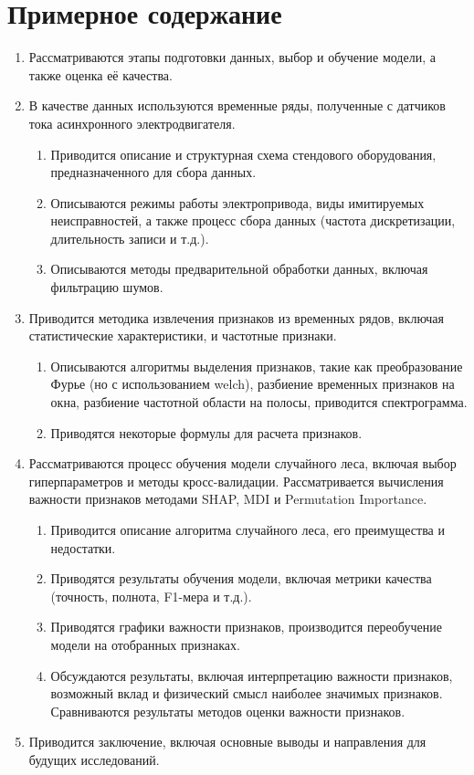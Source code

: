 \chapter*{Примерное содержание}

\begin{enumerate}
    \item Рассматриваются этапы подготовки данных, выбор и обучение модели, а также оценка её качества.
    \item В качестве данных используются временные ряды, полученные с датчиков тока асинхронного электродвигателя.
    \begin{enumerate}
        \item Приводится описание и структурная схема стендового оборудования, предназначенного для сбора данных.
        \item Описываются режимы работы электропривода, виды имитируемых неисправностей, а также процесс сбора данных (частота дискретизации, длительность записи и т.д.).
        \item Описываются методы предварительной обработки данных, включая фильтрацию шумов.
    \end{enumerate}
    \item Приводится методика извлечения признаков из временных рядов, включая статистические характеристики, и частотные признаки.
    \begin{enumerate}
        \item Описываются алгоритмы выделения признаков, такие как преобразование Фурье (но с использованием welch), разбиение временных признаков на окна, разбиение частотной области на полосы, приводится спектрограмма.
        \item Приводятся некоторые формулы для расчета признаков.
    \end{enumerate}
    \item Рассматриваются процесс обучения модели случайного леса, включая выбор гиперпараметров и методы кросс-валидации. Рассматривается вычисления важности признаков методами SHAP, MDI и Permutation Importance.
    \begin{enumerate}
        \item Приводится описание алгоритма случайного леса, его преимущества и недостатки.
        \item Приводятся результаты обучения модели, включая метрики качества (точность, полнота, F1-мера и т.д.).
        \item Приводятся графики важности признаков, производится переобучение модели на отобранных признаках.
        \item Обсуждаются результаты, включая интерпретацию важности признаков, возможный вклад и физический смысл наиболее значимых признаков. Сравниваются результаты методов оценки важности признаков.
    \end{enumerate}
    \item Приводится заключение, включая основные выводы и направления для будущих исследований.
\end{enumerate}

